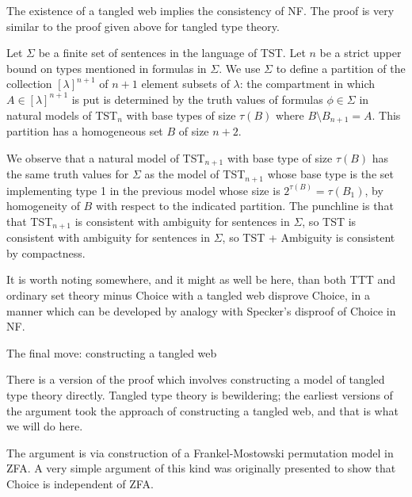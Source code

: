 \documentclass{slides}
\begin{document}
\begin{slide}

The existence of a tangled web implies the consistency of NF.  The proof is very similar to the proof given above for tangled type theory.

Let $\Sigma$ be a finite set of sentences in the language of TST.  Let $n$ be a strict upper bound on types mentioned in formulas in $\Sigma$.  We use $\Sigma$ to define a partition of the collection $[\lambda]^{n+1}$ of $n+1$ element subsets of $\lambda$:  the compartment in which $A \in [\lambda]^{n+1}$ is  put is determined by the truth values of formulas $\phi \in \Sigma$ in
natural models of TST$_n$ with base types of size $\tau(B)$ where $B \setminus B_{n+1}=A$.  This partition has a homogeneous set $B$ of size $n+2$.  

\end{slide}
\begin{slide}

We observe
that a natural model of TST$_{n+1}$ with base type of size $\tau(B)$ has the same truth values for $\Sigma$ as the model of TST$_{n+1}$ whose base type is the set implementing
type 1 in the previous model whose size is $2^{\tau(B)} = \tau(B_1)$, by homogeneity of $B$ with respect to the indicated partition.  The punchline is that that TST$_{n+1}$
is consistent with ambiguity for sentences in $\Sigma$, so TST is consistent with ambiguity for sentences in $\Sigma$, so TST + Ambiguity is consistent by compactness.

It is worth noting somewhere, and it might as well be here, than both TTT and ordinary set theory minus Choice with a tangled web disprove Choice, in a manner which can be developed by analogy with Specker's disproof of Choice in NF.

\end{slide}

\begin{slide}

{\Large The final move:  constructing a tangled web}

There is a version of the proof which involves constructing a model of tangled type theory directly.  Tangled type theory is bewildering;  the earliest versions of the argument took the approach of constructing a tangled web, and that is what we will do here.

The argument is via construction of a Frankel-Mostowski permutation model in ZFA.  A very simple argument of this kind was originally presented to show that Choice is independent
of ZFA.


\end{slide}
\end{document}
